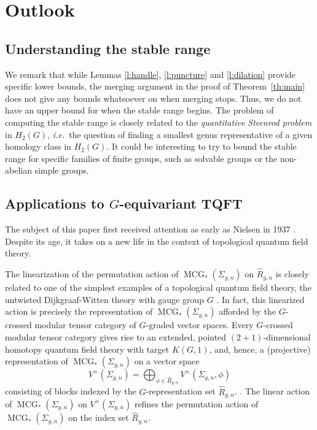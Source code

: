 \documentclass[10pt,twocolumn,amsmath,amssymb,aps,pra,secnumarabic,
    nofootinbib,groupedaddress]{revtex4-1}
\newcommand{\Thm}[1]{Theorem~\ref{#1}}
\newcommand{\ie}{\emph{i.e.~}}
\newcommand{\MCG}{\operatorname{MCG}}
\newcommand{\hR}{\hat{R}}
\begin{document}
\section{Outlook}
\label{s:outlook}
\subsection{Understanding the stable range}
\label{ss:unstable}
We remark that while Lemmas \ref{l:handle}, \ref{l:puncture} and \ref{l:dilation} provide specific lower bounds, the merging argument in the proof of \Thm{th:main} does not give any bounds whatsoever on when merging stops.  Thus, we do not have an upper bound for when the stable range begins.  The problem of computing the stable range is closely related to the \emph{quantitative Steenrod problem} in $H_2(G)$, \ie the question of finding a smallest genus representative of a given homology class in $H_2(G)$.  It could be interesting to try to bound the stable range for specific families of finite groups, such as solvable groups or the non-abelian simple groups.

\subsection{Applications to $G$-equivariant TQFT}
\label{ss:motivation}
The subject of this paper first received attention as early as Nielsen in 1937 \cite{Nielsen:periodisher}.  Despite its age, it takes on a new life in the context of topological quantum field theory.

The linearization of the permutation action of $\MCG_*(\Sigma_{g,n})$ on $\hR_{g,n}$ is closely related to one of the simplest examples of a topological quantum field theory, the untwisted Dijkgraaf-Witten theory with gauge group $G$ \cite{DijkgraafWitten:gauge, FreedQuinn:finite}.  In fact, this linearized action is precisely the representation of $\MCG_*(\Sigma_{g,n})$ afforded by the $G$-crossed modular tensor category of $G$-graded vector spaces.  Every $G$-crossed modular tensor category gives rise to an extended, pointed $(2+1)$-dimensional homotopy quantum field theory with target $K(G,1)$, and, hence, a (projective) representation of $\MCG_*(\Sigma_{g,n})$ on a vector space
\[ V^\times(\Sigma_{g,n}) = \bigoplus_{\phi \in \hR_{g,n}} V^\times(\Sigma_{g,n},\phi)\]
consisting of blocks indexed by the $G$-representation set $\hR_{g,n}$. \cite{Turaev:HQFT, TuraevVirelizier:HQFT2}.  The linear action of $\MCG_*(\Sigma_{g,n})$ on $V^\times(\Sigma_{g,n})$ refines the permutation action of $\MCG_*(\Sigma_{g,n})$ on the index set $\hR_{g,n}$.
\end{document}
